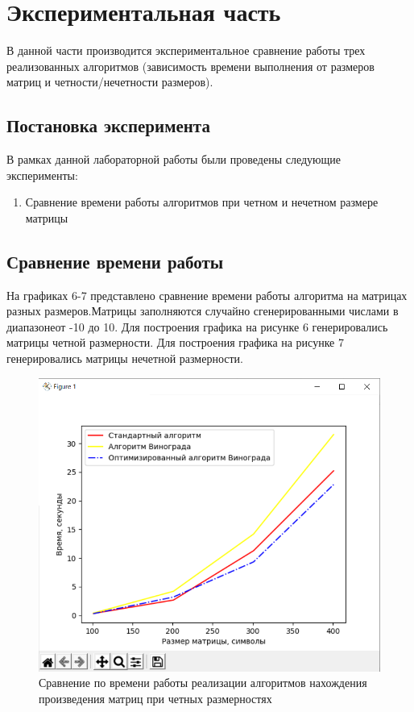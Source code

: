 \documentclass[a4paper,12pt]{article}
\begin{document}
    \newpage

	\section{Экспериментальная часть}
	\hfill
	
	В данной части производится экспериментальное сравнение работы трех реализованных алгоритмов (зависимость времени выполнения от размеров матриц и четности/нечетности размеров).
	\subsection{Постановка эксперимента}
	\hfill
	
	В рамках данной лабораторной работы были проведены следующие эксперименты: 
	\begin{enumerate} 
		\item Сравнение времени работы алгоритмов при четном и нечетном размере
		матрицы
	\end{enumerate} 
	\subsection{Сравнение времени работы}	
	\hfill
	
	На графиках 6-7 представлено сравнение времени работы алгоритма на матрицах разных размеров.Матрицы заполняются случайно сгенерированными числами в диапазонеот -10 до 10. Для построения графика на рисунке 6 генерировались матрицы четной размерности. Для построения графика на рисунке 7 генерировались матрицы нечетной размерности.
	
	\begin{figure}[H]
		\centering
		\includegraphics[scale=0.6]{exp1.png} 
		\captionsetup{justification=centering}
		\caption{Сравнение по времени работы реализации алгоритмов нахождения произведения матриц при четных размерностях}
		\label{тест1}
	\end{figure}
	
\end{document}
